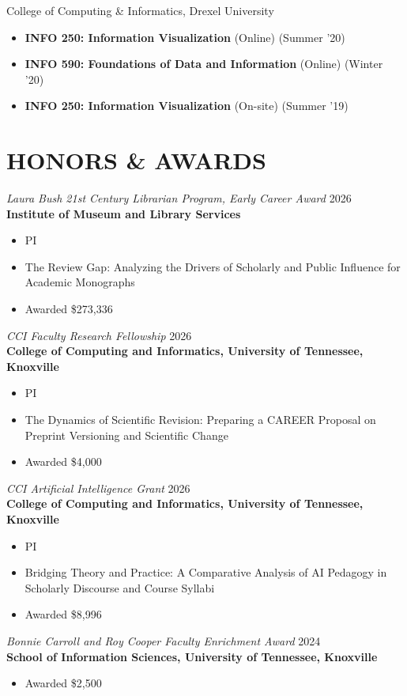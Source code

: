 \documentclass[margin, 10pt]{res} %
\begin{document}
\begin{resume}
College of Computing \& Informatics, Drexel University

\begin{itemize}
\item \textbf{INFO 250: Information Visualization} (Online) (Summer '20)
\item \textbf{INFO 590: Foundations of Data and Information} (Online) (Winter '20)
\item \textbf{INFO 250: Information Visualization} (On-site) (Summer '19)
\end{itemize}

\section{HONORS \& AWARDS}

{\sl Laura Bush 21st Century Librarian Program, Early Career Award} \hfill 2026\\
\textbf{Institute of Museum and Library Services}
\begin{itemize}
\item PI
\item The Review Gap: Analyzing the Drivers of Scholarly and Public Influence for Academic Monographs
\item Awarded \$273,336
\end{itemize}

{\sl CCI Faculty Research Fellowship} \hfill 2026\\
\textbf{College of Computing and Informatics, University of Tennessee, Knoxville}
\begin{itemize}
\item PI
\item The Dynamics of Scientific Revision: Preparing a CAREER Proposal on Preprint
Versioning and Scientific Change
\item Awarded \$4,000
\end{itemize}

{\sl CCI Artificial Intelligence Grant}  \hfill 2026 \\
\textbf{College of Computing and Informatics, University of Tennessee, Knoxville}
\begin{itemize}
\item PI
\item Bridging Theory and Practice: A Comparative Analysis of AI Pedagogy in Scholarly Discourse and Course Syllabi
\item Awarded \$8,996
\end{itemize}

{\sl Bonnie Carroll and Roy Cooper Faculty Enrichment Award}  \hfill 2024 \\
\textbf{School of Information Sciences, University of Tennessee, Knoxville}
\begin{itemize}
\item Awarded \$2,500	
\end{itemize}


\end{resume}
\end{document}
